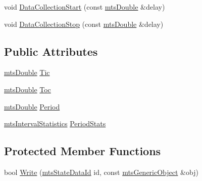 {\bf }\par
\begin{DoxyCompactItemize}
\item 
void \hyperlink{classmts_state_table_ad191fb91b2286463b51939cdf5516a73}{Data\+Collection\+Start} (const \hyperlink{mts_generic_object_proxy_8h_a31e76b0190a8d3f9838626cd7b47bd75}{mts\+Double} \&delay)
\item 
void \hyperlink{classmts_state_table_ab4fbac293ae8c60cb82a6381e887f03c}{Data\+Collection\+Stop} (const \hyperlink{mts_generic_object_proxy_8h_a31e76b0190a8d3f9838626cd7b47bd75}{mts\+Double} \&delay)
\end{DoxyCompactItemize}

\subsection*{Public Attributes}
\begin{DoxyCompactItemize}
\item 
\hyperlink{mts_generic_object_proxy_8h_a31e76b0190a8d3f9838626cd7b47bd75}{mts\+Double} \hyperlink{classmts_state_table_ae4b2244609f4ec292d183d1daeeaf994}{Tic}
\item 
\hyperlink{mts_generic_object_proxy_8h_a31e76b0190a8d3f9838626cd7b47bd75}{mts\+Double} \hyperlink{classmts_state_table_a03193d2edccd43f42e65aaec7207708f}{Toc}
\item 
\hyperlink{mts_generic_object_proxy_8h_a31e76b0190a8d3f9838626cd7b47bd75}{mts\+Double} \hyperlink{classmts_state_table_a4b11db6f64680d32fa7a0fc79ee62862}{Period}
\item 
\hyperlink{classmts_interval_statistics}{mts\+Interval\+Statistics} \hyperlink{classmts_state_table_ae4914598ee6ee5a523f8ecc7008c5ceb}{Period\+Stats}
\end{DoxyCompactItemize}
\subsection*{Protected Member Functions}
\begin{DoxyCompactItemize}
\item 
bool \hyperlink{classmts_state_table_a98e00ccdd5e915cfee752d2dbf38cb31}{Write} (\hyperlink{mts_state_table_8h_ac3a0e34e8991d51790b043fa01857a35}{mts\+State\+Data\+Id} id, const \hyperlink{classmts_generic_object}{mts\+Generic\+Object} \&obj)
\end{DoxyCompactItemize}
